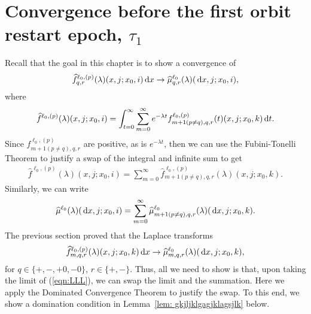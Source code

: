\section{Convergence before the first orbit restart epoch, \(\tau_1\)}\label{sec: before the first}
  
 Recall that the goal in this chapter is to show a convergence of 
\begin{align*}
	\widehat f_{q,r}^{\ell_0,(p)}(\lambda)(x,j;x_0,i) \, \mathrm{d} x
\to
	\widehat \mu_{q,r}^{\ell_0}(\lambda)(\, \mathrm{d} x,j;x_0,i),
\end{align*} 
where 
\[\widehat f^{\ell_0,(p)}(\lambda)(x,j;x_0,i)= \int_{t=0}^\infty \sum\limits_{m=0}^\infty e^{-\lambda t} f_{m+1(p\neq q),q,r}^{\ell_0,(p)}(t)(x,j;x_0,k)\, \mathrm{d} t.\] 
Since \(f_{m+1(p\neq q),q,r}^{\ell_0,(p)}\) are positive, as is \(e^{-\lambda t}\), then we can use the Fubini-Tonelli Theorem to justify a swap of the integral and infinite sum to get 
\begin{align}
	\widehat f^{\ell_0,(p)}(\lambda)(x,j;x_0,i)=  \sum\limits_{m=0}^\infty \widehat f_{m+1(p\neq q),q,r}^{\ell_0,(p)}(\lambda)(x,j;x_0,k).\label{eqn:LLL}
\end{align}
Similarly, we can write 
\[\widehat \mu^{\ell_0}(\lambda)(\, \mathrm{d} x,j;x_0,i)=  \sum\limits_{m=0}^\infty \widehat \mu_{m+1(p\neq q),q,r}^{\ell_0}(\lambda)(\, \mathrm{d} x,j;x_0,k).\] 
The previous section proved that the Laplace transforms
\[\widehat f_{m,q,r}^{\ell_0,(p)}(\lambda)(x,j;x_0,k)\, \mathrm{d} x\to\widehat \mu_{m,q,r}^{\ell_0}(\lambda)(\, \mathrm{d} x,j;x_0,k),\] 
for \(q\in\{+,-,+0,-0\}\), \(r\in\{+,-\}\). Thus, all we need to show is that, upon taking the limit of (\ref{eqn:LLL}), we can swap the limit and the summation. Here we apply the Dominated Convergence Theorem to justify the swap. To this end, we show a domination condition in Lemma~\ref{lem: gkjljklgagjklagsjlk} below.

